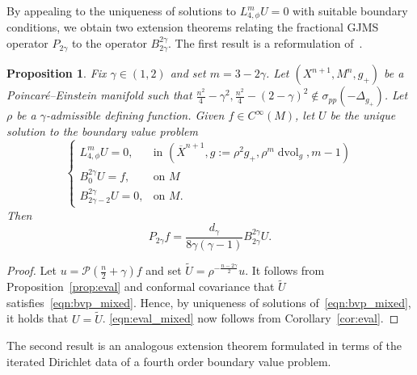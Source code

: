 \documentclass{amsart}
\newtheorem{prop}[thm]{Proposition}
\theoremstyle{definition}
\theoremstyle{remark}
\numberwithin{equation}{section}
\begin{document}
By appealing to the uniqueness of solutions to $L_{4,\phi}^mU=0$ with suitable boundary conditions, we obtain two extension theorems relating the fractional GJMS operator $P_{2\gamma}$ to the operator $B_{2\gamma}^{2\gamma}$.  The first result is a reformulation of~\cite[Theorem~4.4]{CaseChang2013}.

\begin{prop}
 \label{prop:eval_mixed}
 Fix $\gamma\in(1,2)$ and set $m=3-2\gamma$.  Let $(X^{n+1},M^n,g_+)$ be a Poincar\'e--Einstein manifold such that $\frac{n^2}{4}-\gamma^2,\frac{n^2}{4}-(2-\gamma)^2\not\in\sigma_{pp}(-\Delta_{g_+})$.  Let $\rho$ be a $\gamma$-admissible defining function.  Given $f\in C^\infty(M)$, let $U$ be the unique solution to the boundary value problem
 \begin{equation}
  \label{eqn:bvp_mixed}
  \begin{cases}
   L_{4,\phi}^mU = 0, & \text{in $\left({\overline{X}}^{n+1},g:=\rho^2g_+,\rho^m\operatorname{dvol}_g,m-1\right)$} \\
   B_{0}^{2\gamma}U = f, & \text{on $M$} \\
   B_{2\gamma-2}^{2\gamma}U = 0, & \text{on $M$}.
  \end{cases}
 \end{equation}
 Then
 \begin{equation}
 \label{eqn:eval_mixed}
  P_{2\gamma}f = \frac{d_\gamma}{8\gamma(\gamma-1)}B_{2\gamma}^{2\gamma}U .
 \end{equation}
\end{prop}

\begin{proof}
 Let $u={\mathcal{P}}\left(\frac{n}{2}+\gamma\right)f$ and set $\tilde U=\rho^{-\frac{n-2\gamma}{2}}u$.  It follows from Proposition~\ref{prop:eval} and conformal covariance that $\tilde U$ satisfies~\eqref{eqn:bvp_mixed}.  Hence, by uniqueness of solutions of~\eqref{eqn:bvp_mixed}, it holds that $U=\tilde U$.  \eqref{eqn:eval_mixed} now follows from Corollary~\ref{cor:eval}.
\end{proof}

The second result is an analogous extension theorem formulated in terms of the iterated Dirichlet data of a fourth order boundary value problem.
\end{document}
